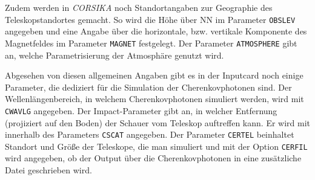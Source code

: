 Zudem werden in \textit{CORSIKA} noch Standortangaben zur Geographie des Teleskopstandortes gemacht.
So wird die Höhe über NN im Parameter \texttt{OBSLEV} angegeben und eine Angabe über die horizontale, bzw. vertikale Komponente des Magnetfeldes im Parameter \texttt{MAGNET} festgelegt.
Der Parameter \texttt{ATMOSPHERE} gibt an, welche Parametrisierung der Atmosphäre genutzt wird.\cite{CORSIKA-Handbook}

Abgesehen von diesen allgemeinen Angaben gibt es in der Inputcard noch einige Parameter, die dediziert für die Simulation der Cherenkovphotonen sind.
Der Wellenlängenbereich, in welchem Cherenkovphotonen simuliert werden, wird mit \texttt{CWAVLG} angegeben.
Der Impact-Parameter gibt an, in welcher Entfernung (projiziert auf den Boden) der Schauer vom Teleskop auftreffen kann. 
Er wird mit innerhalb des Parameters \texttt{CSCAT} angegeben.
Der Parameter \texttt{CERTEL} beinhaltet Standort und Größe der Teleskope, die man simuliert und mit der Option \texttt{CERFIL} wird angegeben, ob der Output über die Cherenkovphotonen in eine zusätzliche Datei geschrieben wird.


